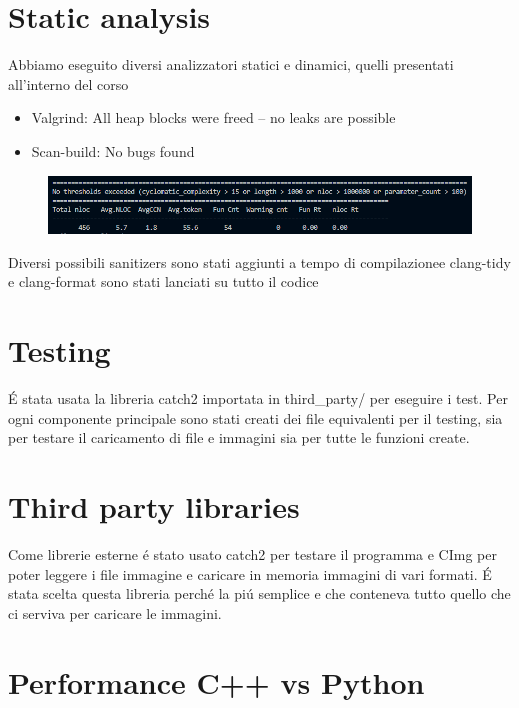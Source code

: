 \documentclass{article}
\begin{document}
\section{Static analysis}
Abbiamo eseguito diversi analizzatori statici e dinamici, quelli presentati all'interno del corso
\begin{itemize}
    \item Valgrind: All heap blocks were freed -- no leaks are possible
    \item Scan-build: No bugs found
\end{itemize}

\begin{figure}[h]
\includegraphics[width=\textwidth]{cyclomatic_complexity.png}
\end{figure}

Diversi possibili sanitizers sono stati aggiunti a tempo di compilazionee clang-tidy e clang-format sono stati lanciati su tutto il codice

\section{Testing}

É stata usata la libreria catch2 importata in third\_party/ per eseguire i test.
Per ogni componente principale sono stati creati dei file equivalenti per il testing, sia per testare il caricamento di file e immagini sia per tutte le funzioni create.



\section{Third party libraries}

Come librerie esterne é stato usato catch2 per testare il programma e CImg per poter leggere i file immagine e caricare in memoria immagini di vari formati.
É stata scelta questa libreria perché la piú semplice e che conteneva tutto quello che ci serviva per caricare le immagini.


\section{Performance C++ vs Python}
\end{document}
